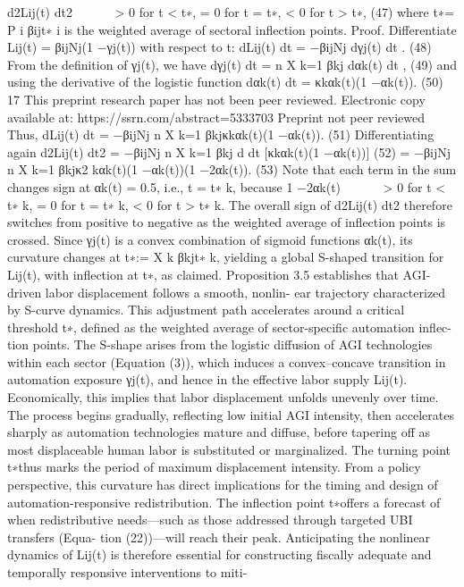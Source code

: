 d2Lij(t)
dt2





> 0
for t < t∗,
= 0
for t = t∗,
< 0
for t > t∗,
(47)
where t∗= P
i βijt∗
i is the weighted average of sectoral inflection points.
Proof. Differentiate Lij(t) = βijNj(1 −γj(t)) with respect to t:
dLij(t)
dt
= −βijNj
dγj(t)
dt
.
(48)
From the definition of γj(t), we have
dγj(t)
dt
=
n
X
k=1
βkj
dαk(t)
dt
,
(49)
and using the derivative of the logistic function
dαk(t)
dt
= κkαk(t)(1 −αk(t)).
(50)
17
This preprint research paper has not been peer reviewed. Electronic copy available at: https://ssrn.com/abstract=5333703
Preprint not peer reviewed
Thus,
dLij(t)
dt
= −βijNj
n
X
k=1
βkjκkαk(t)(1 −αk(t)).
(51)
Differentiating again
d2Lij(t)
dt2
= −βijNj
n
X
k=1
βkj
d
dt [κkαk(t)(1 −αk(t))]
(52)
= −βijNj
n
X
k=1
βkjκ2
kαk(t)(1 −αk(t))(1 −2αk(t)).
(53)
Note that each term in the sum changes sign at αk(t) = 0.5, i.e., t = t∗
k, because
1 −2αk(t)





> 0
for t < t∗
k,
= 0
for t = t∗
k,
< 0
for t > t∗
k.
The overall sign of d2Lij(t)
dt2
therefore switches from positive to negative as the weighted average
of inflection points is crossed. Since γj(t) is a convex combination of sigmoid functions αk(t),
its curvature changes at
t∗:=
X
k
βkjt∗
k,
yielding a global S-shaped transition for Lij(t), with inflection at t∗, as claimed.
Proposition 3.5 establishes that AGI-driven labor displacement follows a smooth, nonlin-
ear trajectory characterized by S-curve dynamics. This adjustment path accelerates around
a critical threshold t∗, defined as the weighted average of sector-specific automation inflec-
tion points. The S-shape arises from the logistic diffusion of AGI technologies within each
sector (Equation (3)), which induces a convex–concave transition in automation exposure
γj(t), and hence in the effective labor supply Lij(t).
Economically, this implies that labor displacement unfolds unevenly over time.
The
process begins gradually, reflecting low initial AGI intensity, then accelerates sharply as
automation technologies mature and diffuse, before tapering off as most displaceable human
labor is substituted or marginalized. The turning point t∗thus marks the period of maximum
displacement intensity.
From a policy perspective, this curvature has direct implications for the timing and
design of automation-responsive redistribution. The inflection point t∗offers a forecast of
when redistributive needs—such as those addressed through targeted UBI transfers (Equa-
tion (22))—will reach their peak. Anticipating the nonlinear dynamics of Lij(t) is therefore
essential for constructing fiscally adequate and temporally responsive interventions to miti-

